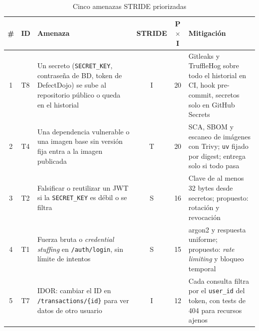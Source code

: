 \begin{table}[H]
    \centering
    \small
    \caption{Cinco amenazas STRIDE priorizadas}
    \label{tab:stride-top5}
    \begin{tabularx}{\textwidth}{@{}c l X c c X@{}}
        \toprule
        \textbf{\#} & \textbf{ID} & \textbf{Amenaza} & \textbf{STRIDE} & \textbf{P$\times$I} & \textbf{Mitigación} \\
        \midrule
        1 & T8 & Un secreto (\texttt{SECRET\_KEY}, contraseña de BD, token de DefectDojo) se sube al repositorio público o queda en el historial & I & 20 & Gitleaks y TruffleHog sobre todo el historial en CI, hook pre-commit, secretos solo en GitHub Secrets \\
        2 & T4 & Una dependencia vulnerable o una imagen base sin versión fija entra a la imagen publicada & T & 20 & SCA, SBOM y escaneo de imágenes con Trivy; \texttt{uv} fijado por digest; entrega solo si todo pasa \\
        3 & T2 & Falsificar o reutilizar un JWT si la \texttt{SECRET\_KEY} es débil o se filtra & S & 16 & Clave de al menos 32 bytes desde secretos; propuesto: rotación y revocación \\
        4 & T1 & Fuerza bruta o \textit{credential stuffing} en \texttt{/auth/login}, sin límite de intentos & S & 15 & argon2 y respuesta uniforme; propuesto: \textit{rate limiting} y bloqueo temporal \\
        5 & T7 & IDOR: cambiar el ID en \texttt{/transactions/\{id\}} para ver datos de otro usuario & I & 12 & Cada consulta filtra por el \texttt{user\_id} del token, con tests de 404 para recursos ajenos \\
        \bottomrule
    \end{tabularx}
\end{table}

